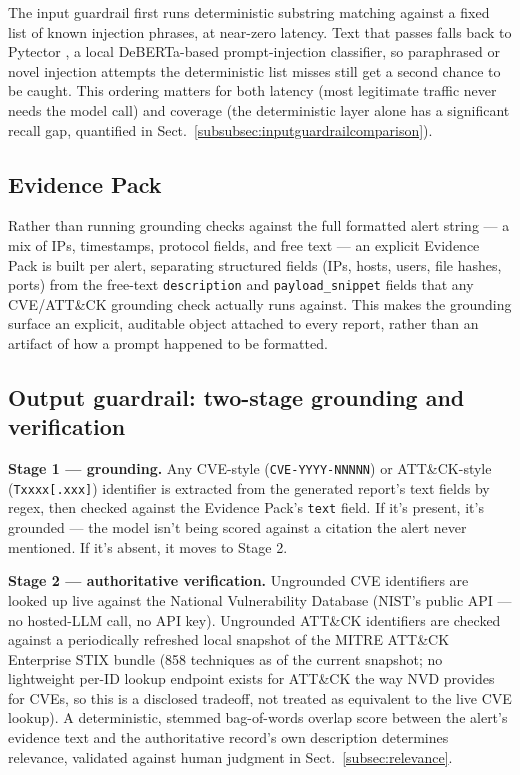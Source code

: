\documentclass[pdflatex,sn-mathphys-num]{sn-jnl}%
\begin{document}
The input guardrail first runs deterministic substring matching against
a fixed list of known injection phrases, at near-zero latency. Text that
passes falls back to Pytector \cite{pytector2024}, a local DeBERTa-based
prompt-injection classifier, so paraphrased or novel injection attempts
the deterministic list misses still get a second chance to be caught.
This ordering matters for both latency (most legitimate traffic never
needs the model call) and coverage (the deterministic layer alone has a
significant recall gap, quantified in
Sect.~\ref{subsubsec:inputguardrailcomparison}).

\subsection{Evidence Pack}\label{subsec:evidence-pack}

Rather than running grounding checks against the full formatted alert
string --- a mix of IPs, timestamps, protocol fields, and free text --- an
explicit Evidence Pack is built per alert, separating structured fields
(IPs, hosts, users, file hashes, ports) from the free-text
\texttt{description} and \texttt{payload\_snippet} fields that any
CVE/ATT\&CK grounding check actually runs against. This makes the
grounding surface an explicit, auditable object attached to every
report, rather than an artifact of how a prompt happened to be
formatted.

\subsection{Output guardrail: two-stage grounding and verification}\label{subsec:output-guardrail}

\textbf{Stage 1 --- grounding.} Any CVE-style (\texttt{CVE-YYYY-NNNNN})
or ATT\&CK-style (\texttt{Txxxx[.xxx]}) identifier is extracted from the
generated report's text fields by regex, then checked against the
Evidence Pack's \texttt{text} field. If it's present, it's grounded ---
the model isn't being scored against a citation the alert never
mentioned. If it's absent, it moves to Stage 2.

\textbf{Stage 2 --- authoritative verification.} Ungrounded CVE
identifiers are looked up live against the National Vulnerability
Database \cite{nvd} (NIST's public API --- no hosted-LLM call, no API
key). Ungrounded ATT\&CK identifiers are checked against a periodically
refreshed local snapshot of the MITRE ATT\&CK \cite{mitreattack}
Enterprise STIX bundle (858 techniques as of the current snapshot; no
lightweight per-ID lookup endpoint exists for ATT\&CK the way NVD
provides for CVEs, so this is a disclosed tradeoff, not treated as
equivalent to the live CVE lookup). A deterministic, stemmed
bag-of-words overlap score between the alert's evidence text and the
authoritative record's own description determines relevance, validated
against human judgment in Sect.~\ref{subsec:relevance}.
\end{document}
